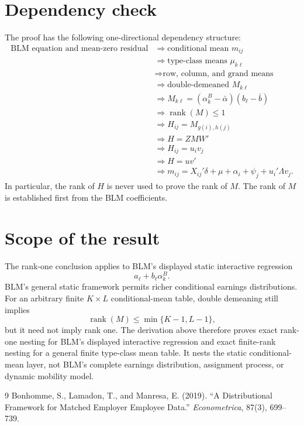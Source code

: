 \documentclass[11pt]{article}
\newcommand{\rank}{\operatorname{rank}}
\begin{document}
\section*{Dependency check}

The proof has the following one-directional dependency structure:
\[
\begin{aligned}
\text{BLM equation and mean-zero residual}
&\Longrightarrow
\text{conditional mean }m_{ij}\\
&\Longrightarrow
\text{type-class means }\mu_{k\ell}\\
&\Longrightarrow
\text{row, column, and grand means}\\
&\Longrightarrow
\text{double-demeaned }M_{k\ell}\\
&\Longrightarrow
M_{k\ell}
=(\alpha_k^B-\bar\alpha)(b_\ell-\bar b)\\
&\Longrightarrow
\rank(M)\leq1\\
&\Longrightarrow
H_{ij}=M_{g(i),h(j)}\\
&\Longrightarrow
H=ZMW'\\
&\Longrightarrow
H_{ij}=u_iv_j\\
&\Longrightarrow
H=uv'\\
&\Longrightarrow
m_{ij}
=X_{ij}'\delta+\mu+\alpha_i+\psi_j+u_i'\Lambda v_j.
\end{aligned}
\]
In particular, the rank of \(H\) is never used to prove the rank of \(M\).
The rank of \(M\) is established first from the BLM coefficients.

\section*{Scope of the result}

The rank-one conclusion applies to BLM's displayed static interactive
regression
\[
a_\ell+b_\ell\alpha_k^B.
\]
BLM's general static framework permits richer conditional earnings
distributions.  For an arbitrary finite \(K\times L\) conditional-mean table,
double demeaning still implies
\[
\rank(M)\leq\min\{K-1,L-1\},
\]
but it need not imply rank one.  The derivation above therefore proves exact
rank-one nesting for BLM's displayed interactive regression and exact
finite-rank nesting for a general finite type-class mean table.  It nests the
static conditional-mean layer, not BLM's complete earnings distribution,
assignment process, or dynamic mobility model.

\begin{thebibliography}{9}
Bonhomme, S., Lamadon, T., and Manresa, E. (2019).
``A Distributional Framework for Matched Employer Employee Data.''
\emph{Econometrica}, 87(3), 699--739.
\end{thebibliography}
\end{document}
